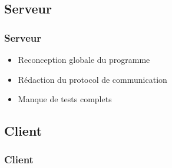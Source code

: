 \subsection{Serveur}
	\begin{frame}
		\frametitle{Serveur}
        \begin{itemize}
            \item Reconception globale du programme
            \item Rédaction du protocol de communication
            \item Manque de tests complets
        \end{itemize}
	\end{frame}

\subsection{Client}
	\begin{frame}
		\frametitle{Client}
	\end{frame}
